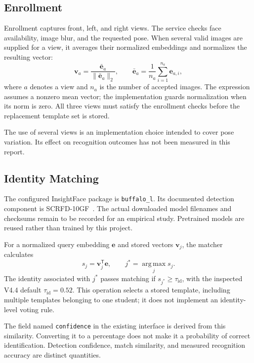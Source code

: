 \documentclass[conference,a4paper]{IEEEtran}
\begin{document}
\subsection{Enrollment}
Enrollment captures front, left, and right views. The service checks face availability, image blur, and the requested pose. When several valid images are supplied for a view, it averages their normalized embeddings and normalizes the resulting vector:
\begin{equation}
\mathbf{v}_{a}=\frac{\bar{\mathbf{e}}_{a}}{\|\bar{\mathbf{e}}_{a}\|_2},\qquad
\bar{\mathbf{e}}_{a}=\frac{1}{n_a}\sum_{i=1}^{n_a}\mathbf{e}_{a,i},
\end{equation}
where $a$ denotes a view and $n_a$ is the number of accepted images. The expression assumes a nonzero mean vector; the implementation guards normalization when its norm is zero. All three views must satisfy the enrollment checks before the replacement template set is stored.

The use of several views is an implementation choice intended to cover pose variation. Its effect on recognition outcomes has not been measured in this report.

\subsection{Identity Matching}
The configured InsightFace package is \texttt{buffalo\_l}. Its documented detection component is SCRFD-10GF~\cite{modelzoo}. The actual downloaded model filenames and checksums remain to be recorded for an empirical study. Pretrained models are reused rather than trained by this project.

For a normalized query embedding $\mathbf{e}$ and stored vectors $\mathbf{v}_j$, the matcher calculates
\begin{equation}
s_j=\mathbf{v}_j^{\mathsf T}\mathbf{e},\qquad j^*=\operatorname*{arg\,max}_{j}s_j.
\end{equation}
The identity associated with $j^*$ passes matching if $s_{j^*}\geq\tau_{\mathrm{id}}$, with the inspected V4.4 default $\tau_{\mathrm{id}}=0.52$. This operation selects a stored template, including multiple templates belonging to one student; it does not implement an identity-level voting rule.

The field named \texttt{confidence} in the existing interface is derived from this similarity. Converting it to a percentage does not make it a probability of correct identification. Detection confidence, match similarity, and measured recognition accuracy are distinct quantities.
\end{document}
